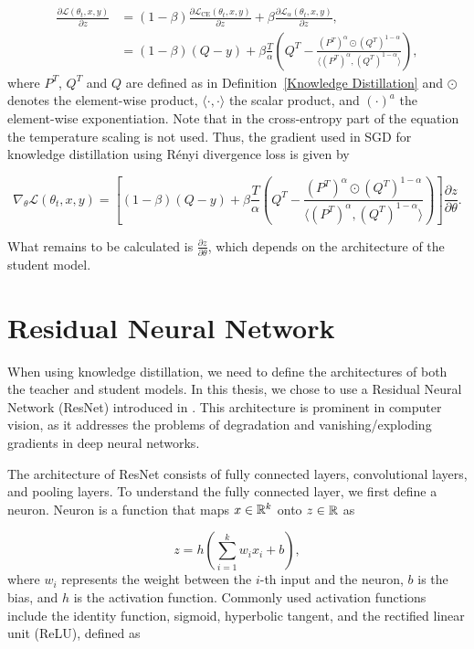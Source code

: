 \begin{equation*}
	\begin{aligned}
		\frac{\partial \mathcal{L}(\theta_t,x,y)}{\partial z} &= (1-\beta) \frac{\partial \mathcal{L}_{\text{CE}}(\theta_t,x,y)}{\partial z} + \beta \frac{\partial \mathcal{L}_{\alpha}(\theta_t,x,y)}{\partial z}, \\
		&=(1-\beta)(Q - y) + \beta \frac{T}{\alpha} \left( Q^T - \frac{(P^T)^\alpha \odot (Q^T)^{1-\alpha}}{\langle (P^T)^\alpha, (Q^T)^{1-\alpha} \rangle} \right),
	\end{aligned}
\end{equation*}
where $P^T$, $Q^T$ and $Q$ are defined as in Definition~\ref{Knowledge Distillation} and $\odot$ denotes the element-wise product, $\langle \cdot, \cdot \rangle$ the scalar product, and $(\cdot)^a$ the element-wise exponentiation. Note that in the cross-entropy part of the equation the temperature scaling is not used. Thus, the gradient used in SGD for knowledge distillation using Rényi divergence loss is given by

\begin{equation*}
	\nabla_\theta \mathcal{L}(\theta_t,x,y) = \left[ (1-\beta)(Q - y) + \beta \frac{T}{\alpha} \left( Q^T - \frac{(P^T)^\alpha \odot (Q^T)^{1-\alpha}}{\langle (P^T)^\alpha, (Q^T)^{1-\alpha} \rangle} \right) \right] \frac{\partial z}{\partial \theta}.
\end{equation*}

What remains to be calculated is $\frac{\partial z}{\partial \theta}$, which depends on the architecture of the student model.

\section{Residual Neural Network}

When using knowledge distillation, we need to define the architectures of both the teacher and student models. In this thesis, we chose to use a Residual Neural Network (ResNet) introduced in \cite{He2016}. This architecture is prominent in computer vision, as it addresses the problems of degradation and vanishing/exploding gradients in deep neural networks.

The architecture of ResNet consists of fully connected layers, convolutional layers, and pooling layers. To understand the fully connected layer, we first define a neuron. Neuron is a function that maps $x \in \mathbb{R}^k$ onto $z \in \mathbb{R}$ as

\begin{equation*}
	z = h ( \sum_{i=1}^{k} w_i x_i + b ),
\end{equation*}
where $w_i$ represents the weight between the $i$-th input and the neuron, $b$ is the bias, and $h$ is the activation function. Commonly used activation functions include the identity function, sigmoid, hyperbolic tangent, and the rectified linear unit (ReLU), defined as

